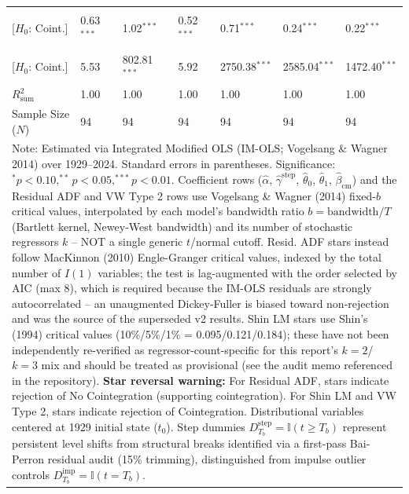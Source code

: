 \begin{table}[H]
\begin{tabular}{p{3.8cm}p{1.35cm}p{1.35cm}p{1.35cm}p{1.35cm}p{1.35cm}p{1.35cm}}
\makecell[l]{Shin LM ($C_{\text{Shin}}$) \\ {\scriptsize [$H_0$: Coint.]}} & 0.63$^{***}$ & 1.02$^{***}$ & 0.52$^{***}$ & 0.71$^{***}$ & 0.24$^{***}$ & 0.22$^{***}$  \\
\makecell[l]{VW Type 2 ($S_{\text{Type 2}}$) \\ {\scriptsize [$H_0$: Coint.]}} & 5.53 & 802.81$^{***}$ & 5.92 & 2750.38$^{***}$ & 2585.04$^{***}$ & 1472.40$^{***}$  \\
\midrule
$R^2_{\text{sum}}$ & 1.00 & 1.00 & 1.00 & 1.00 & 1.00 & 1.00  \\
Sample Size ($N$) & 94 & 94 & 94 & 94 & 94 & 94  \\
\bottomrule
\multicolumn{7}{p{13.2cm}}{\footnotesize Note: Estimated via Integrated Modified OLS (IM-OLS; Vogelsang \& Wagner 2014) over 1929--2024. Standard errors in parentheses. Significance: $^*p<0.10, ^{**}p<0.05, ^{***}p<0.01$. Coefficient rows ($\hat{\alpha}$, $\hat{\gamma}^{\text{step}}$, $\hat{\theta}_0$, $\hat{\theta}_1$, $\hat{\beta}_{\text{cm}}$) and the Residual ADF and VW Type 2 rows use Vogelsang \& Wagner (2014) fixed-$b$ critical values, interpolated by each model's bandwidth ratio $b=\text{bandwidth}/T$ (Bartlett kernel, Newey-West bandwidth) and its number of stochastic regressors $k$ -- NOT a single generic $t$/normal cutoff. Resid. ADF stars instead follow MacKinnon (2010) Engle-Granger critical values, indexed by the total number of $I(1)$ variables; the test is lag-augmented with the order selected by AIC (max 8), which is required because the IM-OLS residuals are strongly autocorrelated -- an unaugmented Dickey-Fuller is biased toward non-rejection and was the source of the superseded v2 results. Shin LM stars use Shin's (1994) critical values (10\%/5\%/1\% = 0.095/0.121/0.184); these have not been independently re-verified as regressor-count-specific for this report's $k=2$/$k=3$ mix and should be treated as provisional (see the audit memo referenced in the repository). \textbf{Star reversal warning:} For Residual ADF, stars indicate rejection of No Cointegration (supporting cointegration). For Shin LM and VW Type 2, stars indicate rejection of Cointegration. Distributional variables centered at 1929 initial state ($t_0$). Step dummies $D^{\text{step}}_{T_b} = \mathbb{I}(t \ge T_b)$ represent persistent level shifts from structural breaks identified via a first-pass Bai-Perron residual audit (15\% trimming), distinguished from impulse outlier controls $D^{\text{imp}}_{T_b} = \mathbb{I}(t = T_b)$.}
\end{tabular}
\end{table}
